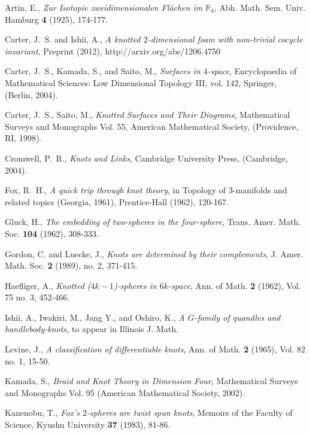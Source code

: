 \documentclass{amsart}
\theoremstyle{definition}
\theoremstyle{remark}
\numberwithin{equation}{section}
\begin{document}

\begin{thebibliography}{99}


 Artin, E., \emph{Zur Isotopie zweidimensionalen Fl\"{a}chen im $\mathbb{R}_{4}$}, Abh. Math. Sem. Univ. Hamburg {\bf 4} (1925), 174-177.


 Carter, J.~S. and Ishii, A., \emph{A knotted $2$-dimensional foam with
  non-trivial cocycle invariant}, Preprint (2012), http://arxiv.org/abs/1206.4750

 Carter, J.~S., Kamada, S., and Saito, M., \emph{Surfaces in $4$-space}, Encyclopaedia of Mathematical Sciences: Low Dimensional Topology III, vol. 142, Springer, (Berlin, 2004).




 Carter, J.~S., Saito, M., \emph{Knotted Surfaces and Their Diagrams}, Mathematical Surveys and Monographs Vol. 55, American Mathematical Society, (Providence, RI, 1998).

 Cromwell, P.~R., \emph{Knots and Links}, Cambridge University Press, (Cambridge, 2004).

 Fox, R.~H., \emph{A quick trip through knot theory}, in Topology of $3$-manifolds and related topics (Georgia, 1961), Prentice-Hall (1962), 120-167.

 Gluck, H., \emph{The embedding of two-spheres in the four-sphere}, Trans. Amer. Math. Soc. {\bf 104} (1962), 308-333.

 Gordon, C. and Luecke, J., \emph{Knots are determined by their complements}, J. Amer. Math. Soc. {\bf 2} (1989), no. 2, 371-415.


 Haefliger, A., \emph{Knotted ($4k-1$)-spheres in $6k$-space}, Ann. of Math. {\bf 2} (1962), Vol. 75 no. 3, 452-466.

  Ishii, A.,   Iwakiri, M.,  Jang Y.,  and  Oshiro, K., 
\emph{A $G$-family of quandles and handlebody-knots,}
to appear in Illinois J. Math. 


 Levine, J., \emph{A classification of differentiable knots}, Ann. of Math. {\bf 2} (1965), Vol. 82 no. 1, 15-50.


 Kamada, S., \emph{Braid and Knot Theory in Dimension Four}, Mathematical Surveys and Monographs Vol. 95 (American Mathematical Society, 2002).

 Kanenobu, T., \emph{Fox's $2$-spheres are twist spun knots}, Memoirs of the Faculty of Science, Kyushu University {\bf 37} (1983), 81-86.



\end{thebibliography}
\end{document}
